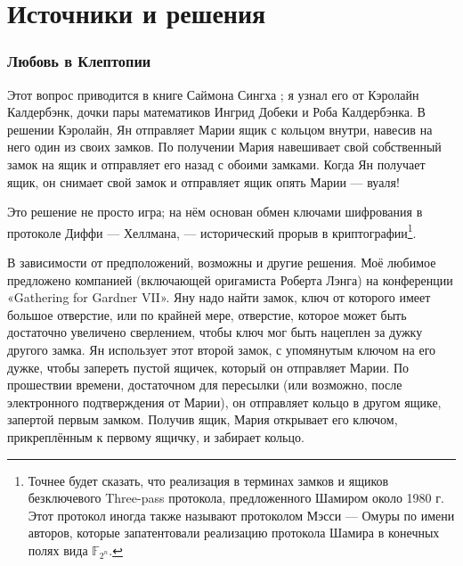 \section*{Источники и решения}
\subsubsection*{Любовь в Клептопии}

Этот вопрос приводится в книге Саймона Сингха \cite{53};
я узнал его от Кэролайн Калдербэнк, дочки пары математиков Ингрид Добеки и Роба Калдербэнка.
В решении Кэролайн, Ян отправляет Марии ящик с кольцом внутри, навесив на него один из своих замков.
По получении Мария навешивает свой собственный замок на ящик и отправляет его назад с обоими замками.
Когда Ян получает ящик, он снимает свой замок и отправляет ящик опять Марии --- вуаля!

Это решение не просто игра;
на нём основан обмен ключами шифрования в протоколе Диффи — Хеллмана,
--- исторический прорыв в криптографии\footnote{Точнее будет сказать, что реализация в терминах замков и ящиков безключевого Three-pass протокола, предложенного Шамиром около 1980 г. Этот протокол иногда также называют протоколом Мэсси --- Омуры по имени авторов, которые запатентовали реализацию протокола Шамира в конечных полях вида $\mathbb{F}_{2^n}$.}.

В зависимости от предположений, возможны и другие решения.
Моё любимое предложено компанией (включающей оригамиста Роберта Лэнга) на конференции
«Ga\-the\-ring for Gardner VII».
Яну надо найти замок, ключ от которого имеет большое отверстие, или по крайней мере, отверстие, которое может быть достаточно увеличено сверлением, чтобы ключ мог быть нацеплен за дужку другого замка.
Ян использует этот второй замок, с упомянутым ключом на его дужке, чтобы запереть пустой ящичек, который он отправляет Марии.
По прошествии времени, достаточном для пересылки (или возможно, после электронного подтверждения от Марии), он отправляет кольцо в другом ящике, запертой первым замком.
Получив ящик, Мария открывает его ключом, прикреплённым к первому ящичку, и забирает кольцо.


